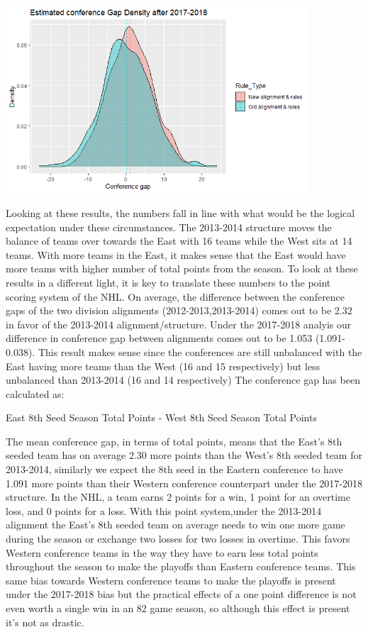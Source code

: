 \documentclass[
]{article}
\begin{document}
\includegraphics[width=0.85\textwidth,height=\textheight]{Images/gapvis20172018.png}

Looking at these results, the numbers fall in line with what would be
the logical expectation under these circumstances. The 2013-2014
structure moves the balance of teams over towards the East with 16 teams
while the West sits at 14 teams. With more teams in the East, it makes
sense that the East would have more teams with higher number of total
points from the season. To look at these results in a different light,
it is key to translate these numbers to the point scoring system of the
NHL. On average, the difference between the conference gaps of the two
division alignments (2012-2013,2013-2014) comes out to be 2.32 in favor
of the 2013-2014 alignment/structure. Under the 2017-2018 analyis our
difference in conference gap between alignments comes out to be 1.053
(1.091-0.038). This result makes sense since the conferences are still
unbalanced with the East having more teams than the West (16 and 15
respectively) but less unbalanced than 2013-2014 (16 and 14
respectively) The conference gap has been calculated as:

East 8th Seed Season Total Points - West 8th Seed Season Total Points

The mean conference gap, in terms of total points, means that the East's
8th seeded team has on average 2.30 more points than the West's 8th
seeded team for 2013-2014, similarly we expect the 8th seed in the
Eastern conference to have 1.091 more points than their Western
conference counterpart under the 2017-2018 structure. In the NHL, a team
earns 2 points for a win, 1 point for an overtime loss, and 0 points for
a loss. With this point system,under the 2013-2014 alignment the East's
8th seeded team on average needs to win one more game during the season
or exchange two losses for two losses in overtime. This favors Western
conference teams in the way they have to earn less total points
throughout the season to make the playoffs than Eastern conference
teams. This same bias towards Western conference teams to make the
playoffs is present under the 2017-2018 bias but the practical effects
of a one point difference is not even worth a single win in an 82 game
season, so although this effect is present it's not as drastic.
\end{document}
